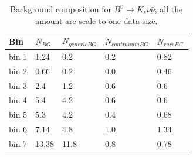 \begin{table}[h]
\small
\begin{center}
\begin{tabu}to \textwidth{ |X[l]|X[c]|X[c]|X[c]|X[c]| }
\hline
 Bin & $N_{BG}$ &$N_{generic BG}$ & $N_{continuum BG}$ & $N_{rare BG}$   \\
 \hline
 bin 1  & 1.24  &0.2 &0.2&0.82\\ 
 \hline
 bin 2  & 0.66  &0.2 & 0.0&0.46\\ 
 \hline
 bin 3  & 2.4   &1.2 & 0.6&0.6\\ 
 \hline
 bin 4  & 5.4   &4.2 & 0.6&0.6 \\ 
 \hline
 bin 5  & 5.3   &4.2 & 0.4&0.68 \\ 
 \hline
 bin 6  & 7.14  &4.8 & 1.0&1.34 \\
 \hline
 bin 7  & 13.38 &11.8& 0.8&0.78 \\ 
 \hline
 \hline
\end{tabu}
\caption{Background composition for $B^0 \rightarrow K_s \nu \bar{\nu}$, all the amount are scale to one data size.} \label{t:bgcomks}
\end{center}
\end{table}

